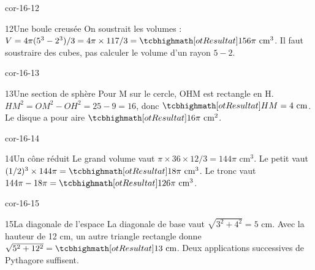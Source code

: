 \begin{blocLivre}{cor-16-12}\begin{corrige}{12}{Une boule creusée}
On soustrait les volumes : $V=4\pi(5^3-2^3)/3=4\pi\times117/3=\res{156\pi\text{ cm}^3}$. Il faut soustraire des cubes, pas calculer le volume d’un rayon $5-2$.
\label{fig-cor-16-12}
\end{corrige}\end{blocLivre}
\begin{blocLivre}{cor-16-13}\begin{corrige}{13}{Une section de sphère}
Pour M sur le cercle, OHM est rectangle en H. $HM^2=OM^2-OH^2=25-9=16$, donc $\res{HM=4\text{ cm}}$. Le disque a pour aire $\res{16\pi\text{ cm}^2}$.
\label{fig-cor-16-13}
\end{corrige}\end{blocLivre}
\begin{blocLivre}{cor-16-14}\begin{corrige}{14}{Un cône réduit}
Le grand volume vaut $\pi\times36\times12/3=144\pi$ cm$^3$. Le petit vaut $(1/2)^3\times144\pi=\res{18\pi\text{ cm}^3}$. Le tronc vaut $144\pi-18\pi=\res{126\pi\text{ cm}^3}$.
\label{fig-cor-16-14}
\end{corrige}\end{blocLivre}
\begin{blocLivre}{cor-16-15}\begin{corrige}{15}{La diagonale de l’espace}
La diagonale de base vaut $\sqrt{3^2+4^2}=5$ cm. Avec la hauteur de 12 cm, un autre triangle rectangle donne $\sqrt{5^2+12^2}=\res{13\text{ cm}}$. Deux applications successives de Pythagore suffisent.
\label{fig-cor-16-15}
\end{corrige}\end{blocLivre}
